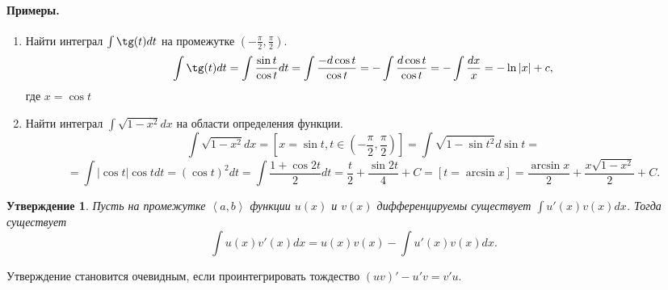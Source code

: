 \documentclass{article}
\theoremstyle{plain}
\newtheorem{claim}{Утверждение}
\theoremstyle{definition}
\theoremstyle{remark}
\begin{document}
\paragraph{Примеры.}
\begin{enumerate}
\item Найти интеграл $\int \tg(t) dt$ на промежутке $(-\frac{\pi}{2}, \frac{\pi}{2}).$
\[\int \tg(t)dt = \int \frac{\sin{t}}{\cos{t}}dt = \int \frac{-d\cos{t}}{\cos{t}} = -\int \frac{d\cos{t}}{\cos{t}} = -\int \frac{dx}{x} = -\ln{|x|} + c,\] где $x = \cos{t}$

\item Найти интеграл $\int \sqrt{1 - x^2}dx$ на области определения функции.
\[\int \sqrt{1 - x^2}dx = [x = \sin{t}, t \in \left(-\frac{\pi}{2}, \frac{\pi}{2}\right)] = \int \sqrt{1 - \sin{t}^2}d\sin{t} =\]\[= \int |\cos{t}|\cos{t}dt = (\cos{t})^2dt = \int \frac{1 + \cos{2t}}{2}dt = \frac{t}{2} + \frac{\sin{2t}}{4} + C = [t = \arcsin{x}] = \frac{\arcsin{x}}{2} + \frac{x\sqrt{1 - x^2}}{2} + C.\]
\end{enumerate}
\begin{claim}\label{cl:partint} Пусть на промежутке $\left<a, b\right>$ функции $u(x)$ и $v(x)$ дифференцируемы существует $\int u'(x)v(x)dx$. Тогда существует \[\int u(x)v'(x)dx = u(x)v(x) - \int u'(x)v(x)dx.\]
\end{claim}
Утверждение становится очевидным, если проинтегрировать тождество $(uv)' - u'v = v'u.$
\end{document}
